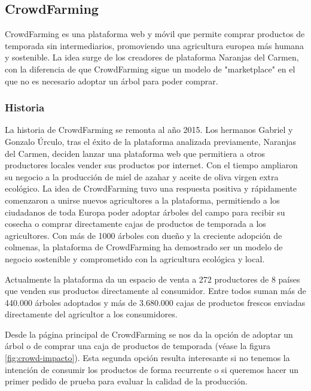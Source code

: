 
\subsection{CrowdFarming}

CrowdFarming es una plataforma web y móvil que permite comprar productos de temporada sin intermediarios, promoviendo una agricultura europea más humana y sostenible. La idea surge de los creadores de plataforma Naranjas del Carmen, con la diferencia de que CrowdFarming sigue un modelo de "marketplace"{} en el que no es necesario adoptar un árbol para poder comprar.

\subsubsection{Historia}

La historia de CrowdFarming se remonta al año 2015. Los hermanos Gabriel y Gonzalo Úrculo, tras el éxito de la plataforma analizada previamente, Naranjas del Carmen, deciden lanzar una plataforma web que permitiera a otros productores locales vender sus productos por internet. Con el tiempo ampliaron su negocio a la producción de miel de azahar y aceite de oliva virgen extra ecológico. La idea de CrowdFarming tuvo una respuesta positiva y rápidamente comenzaron a unirse nuevos agricultores a la plataforma, permitiendo a los ciudadanos de toda Europa poder adoptar árboles del campo para recibir su cosecha o comprar directamente cajas de productos de temporada a los agricultores. Con más de 1000 árboles con dueño y la creciente adopción de colmenas, la plataforma de CrowdFarming ha demostrado ser un modelo de negocio sostenible y comprometido con la agricultura ecológica y local.

Actualmente la plataforma da un espacio de venta a 272 productores de 8 países que venden sus productos directamente al consumidor. Entre todos suman más de 440.000 árboles adoptados y más de 3.680.000 cajas de productos frescos enviadas directamente del agricultor a los consumidores.

Desde la página principal de CrowdFarming se nos da la opción de adoptar un árbol o de comprar una caja de productos de temporada (véase la figura \ref{fig:crowd-impacto}). Esta segunda opción resulta interesante si no tenemos la intención de consumir los productos de forma recurrente o si queremos hacer un primer pedido de prueba para evaluar la calidad de la producción.

